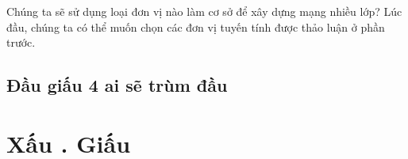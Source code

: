 Chúng ta sẽ sử dụng loại đơn vị nào làm cơ sở để xây dựng mạng nhiều lớp? Lúc đầu, chúng ta có thể muốn chọn các đơn vị tuyến tính được thảo luận ở phần trước.

\subsection{Đầu giấu 4 ai sẽ trùm đầu}

\section{Xấu . Giấu}

